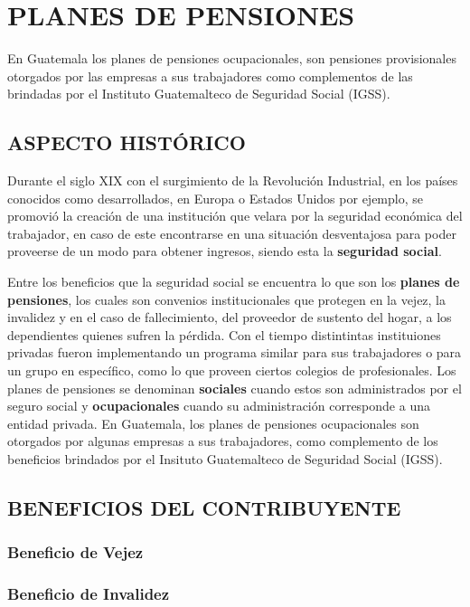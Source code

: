 \chapter{PLANES DE PENSIONES }

En Guatemala los planes de pensiones ocupacionales, son pensiones provisionales otorgados por las empresas a sus trabajadores como complementos de las brindadas por el Instituto Guatemalteco de Seguridad Social (IGSS). 


\section{ASPECTO HISTÓRICO}

Durante el siglo XIX con el surgimiento de la Revolución Industrial, en los países conocidos como desarrollados, en Europa o Estados Unidos por ejemplo,  se promovió la creación de una institución que velara por la seguridad económica del trabajador, en caso de este encontrarse en una situación desventajosa para poder proveerse de un modo para obtener ingresos, siendo esta la \textbf{seguridad social}. 

Entre los beneficios que la seguridad social se encuentra lo que son los \textbf{planes de pensiones}, los cuales son convenios institucionales que protegen en la vejez, la invalidez y en el caso de fallecimiento, del proveedor de sustento del hogar, a los dependientes quienes sufren la pérdida. Con el tiempo distintintas instituiones privadas fueron implementando un programa similar para sus trabajadores o para un grupo en específico, como lo que proveen ciertos colegios de profesionales. Los planes de pensiones se denominan \textbf{sociales} cuando estos son administrados por el seguro social y \textbf{ocupacionales} cuando su administración corresponde a una entidad privada.  En Guatemala, los planes de pensiones ocupacionales son otorgados por algunas empresas a sus trabajadores, como complemento de los beneficios brindados por el Insituto Guatemalteco de Seguridad Social (IGSS). 

\section{BENEFICIOS DEL CONTRIBUYENTE}

\subsection{Beneficio de Vejez}
\subsection{Beneficio de Invalidez}

